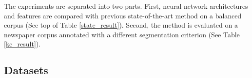 \documentclass[11pt,letterpaper]{article}
\begin{document}
The experiments are separated into two parts. First, neural network architectures and features are compared with previous state-of-the-art method on a balanced corpus (See top of Table \ref{state_result}). 
Second, the method is evaluated on a newspaper corpus annotated with a different segmentation criterion (See Table \ref{kc_result}). 
\subsection{Datasets}
\begin{table}[t]
                                                                                                                                                                                                                                                                                             

\end{table}
\end{document}
